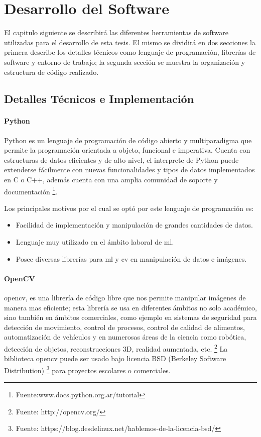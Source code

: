 \chapter{Desarrollo del Software}\label{chap:Desarrollo}

El capitulo siguiente se describirá las diferentes herramientas de software utilizadas para el desarrollo de esta tesis. El mismo se dividirá en dos secciones la primera describe los detalles técnicos como lenguaje de programación, librerías de software y entorno de trabajo; la segunda sección se muestra la organización y estructura de código realizado.


\section{Detalles Técnicos e Implementación}\label{sec:implementacion}

\subsubsection*{Python}
Python es un lenguaje de programación de código abierto y multiparadigma que permite la programación orientada a objeto, funcional e imperativa. 
Cuenta con estructuras de datos eficientes y de alto nivel, el interprete de Python puede extenderse fácilmente  con nuevas funcionalidades y tipos 
de  datos implementados en C o C++, además cuenta con una amplia comunidad de soporte y 
documentación \footnote{Fuente:www.docs.python.org.ar/tutorial}. 

Los principales motivos por el cual se optó por este lenguaje de programación es:
\begin{itemize}
 \item Facilidad de implementación y manipulación de grandes cantidades de datos.
 \item Lenguaje muy utilizado en el ámbito laboral de \ac{ml}.
 \item Posee diversas librerías para \ac{ml} y \ac{cv} en manipulación de datos e imágenes.
\end{itemize}


\subsubsection*{OpenCV}
\ac{opencv}, es una librería de código libre que nos permite manipular imágenes de manera mas eficiente; esta librería se usa en diferentes ámbitos no solo académico, sino también en ámbitos comerciales, como ejemplo en sistemas de seguridad para detección de movimiento, control de procesos, control de calidad de alimentos, automatización de vehículos y en numerosas áreas de la ciencia como robótica, detección de objetos, reconstrucciones 3D, realidad aumentada, etc. \footnote{Fuente: http://opencv.org/} La biblioteca \ac{opencv} puede ser usado bajo licencia BSD (Berkeley Software Distribution) \footnote{Fuente: https://blog.desdelinux.net/hablemos-de-la-licencia-bsd/ } para proyectos escolares o comerciales. 

